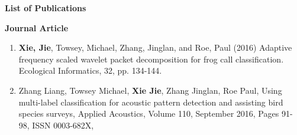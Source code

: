 %





\newpage
\begin{center}
{\huge \textbf{List of Publications}}
\end{center}

{ \large \textbf{Journal Article}}
\begin{enumerate} 
\item	\textbf{Xie, Jie}, Towsey, Michael, Zhang, Jinglan, and Roe, Paul (2016) Adaptive frequency scaled wavelet packet decomposition for frog call classification.  Ecological Informatics, 32, pp. 134-144.
\item	Zhang Liang, Towsey Michael, \textbf{Xie Jie}, Zhang Jinglan, Roe Paul,  Using multi-label classification for acoustic pattern detection and assisting bird species surveys, Applied Acoustics, Volume 110, September 2016, Pages 91-98, ISSN 0003-682X,
\end{enumerate}

